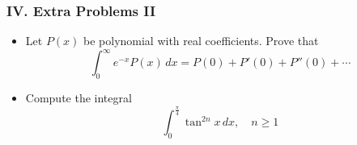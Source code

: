 \documentclass[12pt]{article}
\begin{document}
\vspace{5mm}


\subsubsection*{IV. Extra Problems II}

\begin{itemize}
    \item[\quad \textbf{a.}] Let $P(x)$ be polynomial with real coefficients. Prove that
    \[\int_{0}^{\infty} e^{-x}P(x) \, dx=P(0)+P'(0)+P''(0)+\cdots \]
    \item[\quad \textbf{b.}] Compute the integral
    \[
   \int_{0}^{\frac{\pi}{4}} \tan^{2n}x \, dx, \quad n\ge1
    \]
\end{itemize}

\vspace{5mm}

\end{document}
